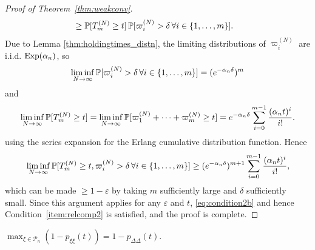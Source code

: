 \begin{proof}[Proof of Theorem~\ref{thm:weakconv}]
\begin{align*}
&\geq \mathbb{P}[ T_m^{(N)} \geq t ]
        \,\mathbb{P}[ \varpi_i^{(N)} > \delta \,\forall i\in \{1,\dots,m\} ] .
\end{align*}
Due to Lemma \ref{thm:holdingtimes_distn}, the limiting distributions of $\varpi_i^{(N)}$ are i.i.d. $\operatorname{Exp}(\alpha_n)$, so
\begin{equation*}
\liminf_{N\to\infty} \mathbb{P}[ \varpi_i^{(N)} > \delta \,\forall i\in \{1,\dots,m\} ]
= (e^{-\alpha_n \delta})^m
\end{equation*}
and
\begin{equation*}
\liminf_{N\to\infty} \mathbb{P}[ T_m^{(N)} \geq t ]
= \liminf_{N\to\infty} \mathbb{P}[ \varpi_1^{(N)} + \cdots + \varpi_m^{(N)} \geq t ]
= e^{-\alpha_n \delta} \sum_{i=0}^{m-1} \frac{(\alpha_n t)^i}{i!} .
\end{equation*}
using the series expansion for the Erlang cumulative distribution function. 
Hence 
\begin{equation*}
\liminf_{N\to\infty} 
        \mathbb{P}[ T_m^{(N)} \geq t, \varpi_i^{(N)} > \delta \,\forall i\in \{1,\dots,m\} ]
\geq (e^{-\alpha_n \delta})^{m+1} \sum_{i=0}^{m-1} \frac{(\alpha_n t)^i}{i!} ,
\end{equation*}
which can be made $\geq 1-\varepsilon$ by taking $m$ sufficiently large and $\delta$ sufficiently small.
Since this argument applies for any $\varepsilon$ and $t$, \eqref{eq:condition2b} and hence Condition~\ref{item:relcomp2} is satisfied, and the proof is complete.
\end{proof}




\begin{lemma}\label{thm:maximum_pr}
$\max_{\xi\in \mathcal{P}_n} (1 - p_{\xi\xi}(t)) = 1 - p_{\Delta\Delta}(t)$.
\end{lemma}

